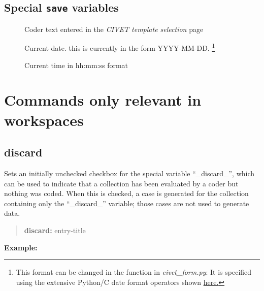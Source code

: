 \documentclass[letterpaper,10pt,english]{sphinxmanual}
\begin{document}
\subsection{Special \texttt{save} variables}
\label{forms:special-save-variables}\begin{description}
\item[{}] \leavevmode
Coder text entered in the \emph{CIVET template selection} page

\item[{}] \leavevmode
Current date. this is currently in the form YYYY-MM-DD. \footnote{
This format can be changed in the function  in
\emph{civet\_form.py}: It is specified using the extensive Python/C date format
operators shown \href{http://strftime.org/}{here.}
}

\item[{}] \leavevmode
Current time in hh:mm:ss format

\end{description}


\section{Commands only relevant in workspaces}
\label{forms:commands-only-relevant-in-workspaces}

\subsection{discard}
\label{forms:discard}
Sets an initially unchecked checkbox for the special variable
“\_discard\_”, which can be used
to indicate that a collection has been evaluated by a coder but nothing
was coded. When this is checked, a case is generated for the collection
containing only the “\_discard\_” variable; those cases are not used to
generate data.
\begin{quote}

\begin{DUlineblock}{0em}
\item[] \textbf{discard:} entry-title
\end{DUlineblock}
\end{quote}

\textbf{Example:}
\begin{quote}

\end{quote}
\end{document}
